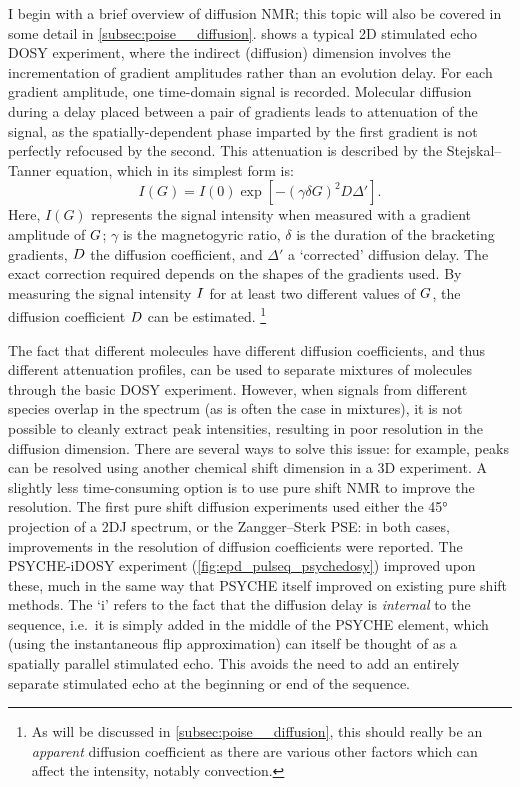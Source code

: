 I begin with a brief overview of diffusion NMR\autocite{Johnson1999PNMRS}; this topic will also be covered in some detail in \cref{subsec:poise__diffusion}.
 shows a typical 2D stimulated echo DOSY experiment, where the indirect (diffusion) dimension involves the incrementation of gradient amplitudes rather than an evolution delay.
For each gradient amplitude, one time-domain signal is recorded.
Molecular diffusion during a delay placed between a pair of gradients leads to attenuation of the signal, as the spatially-dependent phase imparted by the first gradient is not perfectly refocused by the second.
This attenuation is described by the Stejskal--Tanner equation\autocite{Stejskal1965JCP,Sinnaeve2012CMR}, which in its simplest form is:
\begin{equation}
    \label{eq:stejskal_tanner}
    I(G) = I(0) \exp\left[-(\gamma\delta G)^2 D \Delta'\right].
\end{equation}
Here, $I(G)$ represents the signal intensity when measured with a gradient amplitude of $G\/$; $\gamma$ is the magnetogyric ratio, $\delta$ is the duration of the bracketing gradients, $D\/$ the diffusion coefficient, and $\Delta'$ a `corrected' diffusion delay.
The exact correction required depends on the shapes of the gradients used.
By measuring the signal intensity $I\/$ for at least two different values of $G\/$, the diffusion coefficient $D\/$ can be estimated.%
\footnote{As will be discussed in \cref{subsec:poise__diffusion}, this should really be an \textit{apparent} diffusion coefficient as there are various other factors which can affect the intensity, notably convection.}

The fact that different molecules have different diffusion coefficients, and thus different attenuation profiles, can be used to separate mixtures of molecules through the basic DOSY experiment.
However, when signals from different species overlap in the \proton{} spectrum (as is often the case in mixtures), it is not possible to cleanly extract peak intensities, resulting in poor resolution in the diffusion dimension.
There are several ways to solve this issue: for example, peaks can be resolved using another chemical shift dimension in a 3D experiment.
A slightly less time-consuming option is to use pure shift NMR to improve the resolution.
The first pure shift diffusion experiments used either the \ang{45} projection of a 2DJ spectrum\autocite{Cobas2004JMR}, or the Zangger--Sterk PSE\autocite{Nilsson2007CC,Aguilar2010ACIE,Glanzer2014CEJ}: in both cases, improvements in the resolution of diffusion coefficients were reported.
The PSYCHE-iDOSY experiment\autocite{Foroozandeh2016ACIE} (\cref{fig:epd_pulseq_psychedosy}) improved upon these, much in the same way that PSYCHE itself improved on existing pure shift methods.
The `i' refers to the fact that the diffusion delay is \textit{internal} to the sequence, i.e.\ it is simply added in the middle of the PSYCHE element, which (using the instantaneous flip approximation) can itself be thought of as a spatially parallel stimulated echo.
This avoids the need to add an entirely separate stimulated echo at the beginning or end of the sequence.

